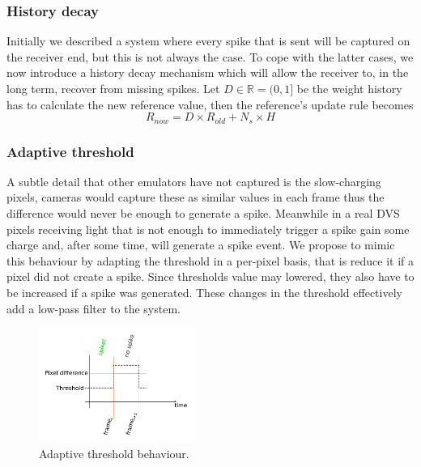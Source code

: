 \documentclass[twocolumn]{article}
\begin{document}
\subsubsection{History decay} %

Initially we described a system where every spike that is sent will be captured on the receiver end, but this is not always the case. To cope with the latter cases, we now introduce a history decay mechanism which will allow the receiver to, in the long term, recover from missing spikes. Let $D \in \mathbb{R} = (0, 1]$ be the weight history has to calculate the new reference value, then the reference's update rule becomes
\begin{equation}
\label{eq:ref_update_decay}
R_{now} = D\times R_{old} + N_{s}\times H
\end{equation}

%

\subsubsection{Adaptive threshold} 
A subtle detail that other emulators have not captured is the slow-charging pixels, cameras would capture these as similar values in each frame thus the difference would never be enough to generate a spike. Meanwhile in a real DVS pixels receiving light that is not enough to immediately trigger a spike gain some charge and, after some time, will generate a spike event. We propose to mimic this behaviour by adapting the threshold in a per-pixel basis, that is reduce it if a pixel did not create a spike. Since thresholds value may lowered, they also have to be increased if a spike was generated. These changes in the threshold effectively add a low-pass filter to the system. 

%
\begin{figure}
  \includegraphics[width=0.45\textwidth]{adaptive_thresh}
  \caption{Adaptive threshold behaviour.}
  \label{fig:adpt_thresh}
\end{figure}
\end{document}
